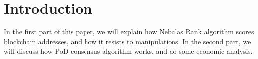 \section{Introduction}

In the first part of this paper, we will explain how Nebulas Rank algorithm scores blockchain addresses, and how it resists to manipulations. In the second part,
we will discuss how PoD consensus algorithm works, and do some economic analysis.
